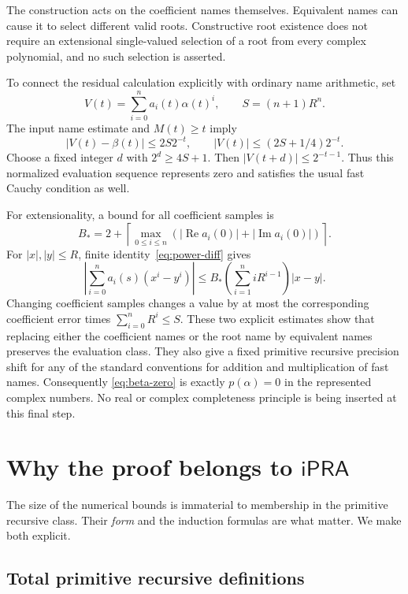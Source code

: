 \documentclass[11pt,letterpaper]{article}
\theoremstyle{definition}\newtheorem{definition}[theorem]{Definition}
\theoremstyle{remark}\newtheorem{remark}[theorem]{Remark}
\newcommand{\ipra}{\mathsf{iPRA}}
\newcommand{\ceil}[1]{\left\lceil#1\right\rceil}
\newcommand{\re}{\operatorname{Re}}\newcommand{\im}{\operatorname{Im}}
\begin{document}
The construction acts on the coefficient names themselves. Equivalent
names can cause it to select different valid roots. Constructive root
existence does not require an extensional single-valued selection of a
root from every complex polynomial, and no such selection is asserted.

To connect the residual calculation explicitly with ordinary name
arithmetic, set
\[
 V(t)=\sum_{i=0}^n a_i(t)\alpha(t)^i,
 \qquad S=(n+1)R^n.
\]
The input name estimate and $M(t)\ge t$ imply
\[
 |V(t)-\beta(t)|\le2S2^{-t},\qquad
 |V(t)|\le(2S+1/4)2^{-t}.
\]
Choose a fixed integer $d$ with $2^d\ge4S+1$.
Then $|V(t+d)|\le2^{-t-1}$. Thus this normalized evaluation sequence
represents zero and satisfies the usual fast Cauchy condition as well.

For extensionality, a bound for all coefficient samples is
\[
 B_* =2+\ceil{\max_{0\le i\le n}
        (|\re a_i(0)|+|\im a_i(0)|)}.
\]
For $|x|,|y|\le R$, finite identity~\eqref{eq:power-diff} gives
\begin{equation}
 \left|\sum_{i=0}^n a_i(s)(x^i-y^i)\right|
       \le B_*\left(\sum_{i=1}^n iR^{i-1}\right)|x-y|.
 \label{eq:poly-lipschitz}
\end{equation}
Changing coefficient samples changes a value by at most the corresponding
coefficient error times $\sum_{i=0}^nR^i\le S$.
These two explicit estimates show that replacing either the coefficient
names or the root name by equivalent names preserves the evaluation class.
They also give a fixed primitive recursive precision shift for any of the
standard conventions for addition and multiplication of fast names.
Consequently \eqref{eq:beta-zero} is exactly $p(\alpha)=0$ in the
represented complex numbers. No real or complex completeness principle is
being inserted at this final step.

\section{Why the proof belongs to \texorpdfstring{$\ipra$}{iPRA}}
\label{sec:ipra-audit}

The size of the numerical bounds is immaterial to membership in the
primitive recursive class. Their \emph{form} and the induction formulas
are what matter. We make both explicit.

\subsection{Total primitive recursive definitions}
\end{document}

